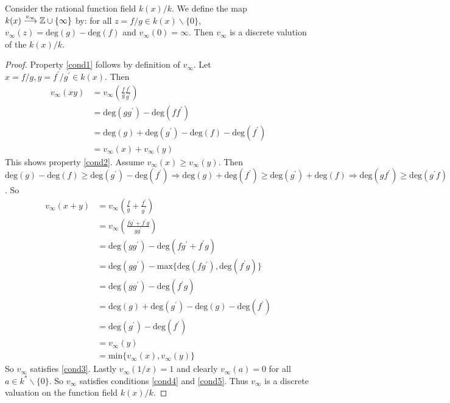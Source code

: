\begin{example} \label{infinityvaluation}
	Consider the rational function field $k(x)/k$. We define the map 
	$k(x) \stackrel{v_{\infty}}{\longrightarrow} \mathbb{Z} \cup \lbrace \infty \rbrace $ by: 
	for all $z = f/g \in k(x) \backslash \lbrace 0 \rbrace $,
	$v_\infty(z)= \text{deg}(g) - \text{deg}(f)$ and $v_\infty(0) = \infty$.
	Then $v_\infty$ is a discrete valution of the $k(x)/k$. 
\end{example}

\begin{proof}
	Property \eqref{cond1} follows by definition of $v_\infty$. 
	Let $x = f/g, y = f^{\prime}/g^{\prime} \in k(x)$. Then 
	\begin{align*}
		v_\infty(xy) &= v_\infty(\frac{f}{g}  \frac{f^{\prime}}{g^{\prime}} ) \\
		&=\text{deg}(gg^{\prime}) - \text{deg}(ff^{\prime}) \\
		&= \text{deg}(g) + \text{deg}(g^{\prime}) - \text{deg}(f) - \text{deg}(f^{\prime}) \\
		&= v_\infty(x) + v_\infty(y)
	\end{align*}
	This shows property \eqref{cond2}. Assume $v_\infty(x) \geq v_\infty(y)$. Then 
	$\text{deg}(g) - \text{deg}(f) \geq \text{deg}(g^{\prime}) - \text{deg}(f^{\prime}) 
	\Longrightarrow \text{deg}(g) + \text{deg}(f^{\prime})  \geq \text{deg}(g^{\prime}) +  \text{deg}(f)
	\Longrightarrow \text{deg}(gf^{\prime}) \geq \text{deg}(g^{\prime}f)$. So  
	\begin{align*}
		v_\infty(x+ y) &= v_\infty(\frac{f}{g} + \frac{f^{\prime}}{g^{\prime}} ) \\
		&= v_\infty(\frac{fg^{\prime} + f^{\prime}g}{gg^{\prime}} ) \\
		&= \text{deg}(gg^{\prime}) - \text{deg} (fg^{\prime} + f^{\prime}g) \\
		&= \text{deg}(gg^{\prime})  - \text{max} \lbrace \text{deg}(fg^{\prime}),
		\text{deg}(f^{\prime}g) \rbrace \\
		&= \text{deg}(gg^{\prime})   - \text{deg}(f^{\prime}g) \\
		&= \text{deg}(g) + \text{deg}(g^{\prime}) - \text{deg}(g) - \text{deg}(f^{\prime}) \\
		&= \text{deg}(g^{\prime}) - \text{deg}(f^{\prime})  \\
		&= v_\infty(y) \\
		&= \text{min} 
		\lbrace v_\infty(x), v_\infty(y) \rbrace
	\end{align*} So $v_\infty$ satisfies \eqref{cond3}. Lastly $v_\infty(1/x) = 1$ 
	and clearly $v_\infty(a) = 0 $ for all $a \in k^* \backslash \lbrace 0 \rbrace$. 
	So $v_\infty $ satisfies conditions \eqref{cond4} and \eqref{cond5}. Thus $v_\infty$
	is a discrete valuation on the function field $k(x)/k$.
\end{proof}

